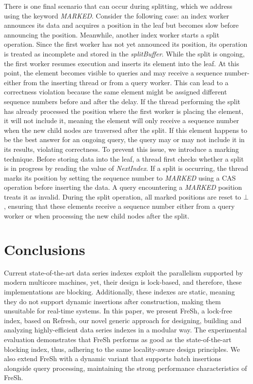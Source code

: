 \documentclass[a4paper,11pt,twoside,openany]{book}
\begin{document}
There is one final scenario that can occur during splitting, which we address
using the keyword \textit{MARKED}. Consider the following case: an index worker
announces its data and acquires a position in the leaf but becomes slow before
announcing the position. Meanwhile, another index worker starts a split operation.
Since the first worker has not yet announced its position, its operation is treated
as incomplete and stored in the \textit{splitBuffer}.  
%
While the split is ongoing, the first worker resumes execution and inserts its element
into the leaf. At this point, the element becomes visible to queries and may receive
a sequence number-either from the inserting thread or from a query worker. This can
lead to a correctness violation because the same element might be assigned different
sequence numbers before and after the delay. If the thread performing the split has
already processed the position where the first worker is placing the element,
it will not include it, meaning the element will only receive a sequence number
when the new child nodes are traversed after the split. If this element happens
to be the best answer for an ongoing query, the query may or may not include it in
its results, violating correctness.  
%
To prevent this issue, we introduce a marking technique. Before storing data into 
the leaf, a thread first checks whether a split is in progress by reading the value
of \textit{NextIndex}. If a split is occurring, the thread marks its position
by setting the sequence number to \textit{MARKED} using a CAS operation before
inserting the data. A query encountering a \textit{MARKED} position treats it as 
invalid. During the split operation, all marked positions are reset to \( \bot \), 
ensuring that these elements receive a sequence number either from a query worker
or when processing the new child nodes after the split.



\chapter{Conclusions}
\label{chapter:Conclusions}

Current state-of-the-art data series indexes exploit the parallelism
supported by modern multicore machines, yet, their
design is lock-based, and therefore, these implementations are
blocking. Additionally, these indexes are static, meaning they do not support
dynamic insertions after construction, making them unsuitable for real-time systems.
In this paper, we present FreSh, a lock-free index,
based on Refresh, our novel generic approach for designing,
building and analyzing highly-efficient data series indexes in a
modular way. The experimental evaluation demonstrates that
FreSh performs as good as the state-of-the-art blocking index,
thus, adhering to the same locality-aware design principles.
We also extend FreSh with a dynamic variant that supports batch insertions
alongside query processing, maintaining the strong performance characteristics of FreSh.
\end{document}
